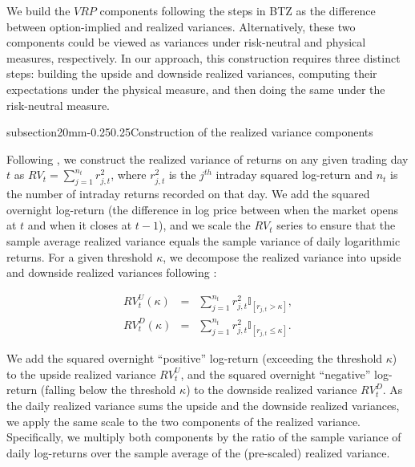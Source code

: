 \documentclass[11pt]{article}
\makeatletter
\renewcommand\subsection{\@startsection%
    {subsection}{2}{0mm}{-0.25\baselineskip}{0.25\baselineskip}{\bfseries\large}}
\makeatother
\begin{document}
We build the $VRP$ components following the steps in BTZ as the difference between option-implied and realized variances. Alternatively, these two components could be viewed as variances under risk-neutral and physical measures, respectively. In our approach, this construction requires three distinct steps: building the upside and downside realized variances, computing their expectations under the physical measure, and then doing the same under the risk-neutral measure.

\subsection{Construction of the realized variance components}\label{SecRealVolDec}

Following \cite{ABDL03Econometrica, ABDE01JFE}, we construct the realized variance of returns on any given trading day $t$ as $RV_t = \sum_{j=1}^{n_t}r^2_{j,t}$, where $r^2_{j,t}$ is the $j^{th}$ intraday squared log-return and $n_t$ is the number of intraday returns recorded on that day. We add the squared overnight log-return (the difference in log price between when the market opens at $t$ and when it closes at $t-1$), and we scale the $RV_t$ series to ensure that the sample average realized variance equals the sample variance of daily logarithmic returns. For a given threshold $\kappa$, we decompose the realized variance into upside and downside realized variances following \cite{BNKinnShep}:

\begin{eqnarray}
  RV^U_t(\kappa) &=&\sum_{j=1}^{n_t}r^2_{j,t}\mathbb{I}_{[r_{j,t}>\kappa]}, \\
  RV^D_t(\kappa) &=&\sum_{j=1}^{n_t}r^2_{j,t}\mathbb{I}_{[r_{j,t}\leq\kappa]}.
\end{eqnarray}

We add the squared overnight ``positive'' log-return (exceeding the threshold $\kappa$) to the upside realized variance $RV^U_t$, and the squared overnight ``negative'' log-return (falling below the threshold $\kappa$) to the downside realized variance $RV^D_t$. As the daily realized variance sums the upside and the downside realized variances, we apply the same scale to the two components of the realized variance. Specifically, we multiply both components by the ratio of the sample variance of daily log-returns over the sample average of the (pre-scaled) realized variance.
\end{document}
